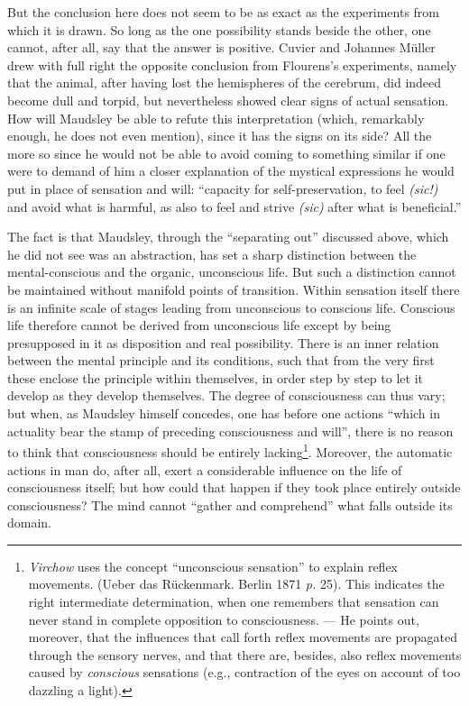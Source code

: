 \documentclass[12pt,a4paper,openany]{book}
\newcommand{\opage}[1]{\marginnote{\footnotesize\textit{[#1]}}}
\begin{document}
But the conclusion here does not seem to be as exact
as the experiments from which it is drawn. So long as
the one possibility stands beside the other, one
cannot, after all, say that the answer is positive. Cuvier and Johannes
Müller drew with full right the opposite conclusion
from Flourens's experiments, namely that the animal, after having lost
the hemispheres of the cerebrum, did indeed become dull and torpid, but
nevertheless showed clear signs of actual sensation. How
will Maudsley be able to refute this interpretation (which,
remarkably enough, he does not even mention), since it has the signs
on its side? All the more so since he would not be able to avoid
\opage{316}coming to something similar if one were to demand of him
a closer explanation of the mystical expressions he would put
in place of sensation and will: ``capacity for self-preservation,
to feel \textit{(sic!)} and avoid what is harmful, as
also to feel and strive \textit{(sic)} after what is beneficial.''

The fact is that Maudsley, through the ``separating out'' discussed above,
which he did not see was an abstraction, has set a
sharp distinction between the mental-conscious and the organic,
unconscious life. But such a distinction cannot be maintained
without manifold points of transition. Within sensation
itself there is an infinite scale of stages leading from
unconscious to conscious life. Conscious life therefore cannot be derived from
unconscious life except by being presupposed in it as disposition and real possibility.
There is an inner relation between the mental principle
and its conditions, such that from the very first these enclose
the principle within themselves, in order step by step to let it
develop as they develop themselves. The degree of consciousness
can thus vary; but when, as Maudsley himself concedes,
one has before one actions ``which in actuality
bear the stamp of preceding consciousness and will'', there is
no reason to think that consciousness should be entirely
lacking\footnote{\emph{Virchow} uses the concept ``unconscious sensation'' to explain reflex movements. (Ueber das Rückenmark. Berlin 1871 \textit{p.} 25). This indicates the right intermediate determination, when one remembers that sensation can never stand in complete opposition to consciousness. --- He points out, moreover, that the influences that call forth reflex movements are propagated through the sensory nerves, and that there are, besides, also reflex movements caused by \emph{conscious} sensations (e.g., contraction of the eyes on account of too dazzling a light).}. Moreover, the automatic actions in man do, after all, exert
a considerable influence on the life of consciousness itself;
but how could that happen if they took place entirely outside
consciousness? The mind cannot ``gather and comprehend''
what falls outside its domain.
\end{document}
